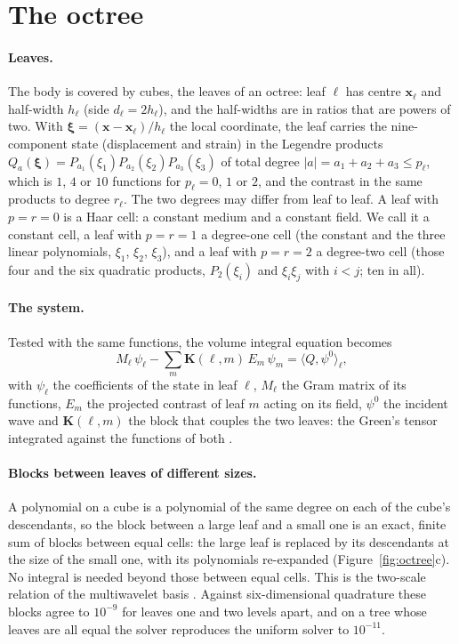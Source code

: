 \documentclass[11pt,a4paper]{article}
\newcommand{\bx}{\mathbf{x}}
\newcommand{\bK}{\mathbf{K}}
\begin{document}
\section{The octree}\label{sec:setting}

\paragraph{Leaves.} The body is covered by cubes, the leaves of an octree: leaf $\ell$ has centre
$\bx_\ell$ and half-width $h_\ell$ (side $d_\ell=2h_\ell$), and the half-widths are in ratios that are
powers of two. With $\boldsymbol\xi=(\bx-\bx_\ell)/h_\ell$ the local coordinate, the leaf carries the
nine-component state (displacement and strain) in the Legendre products
$Q_a(\boldsymbol\xi)=P_{a_1}(\xi_1)P_{a_2}(\xi_2)P_{a_3}(\xi_3)$ of total degree $|a|=a_1+a_2+a_3\le p_\ell$,
which is $1$, $4$ or $10$ functions for $p_\ell=0$, $1$ or $2$, and the contrast in the same products to
degree $r_\ell$. The two degrees may differ from leaf to leaf. A leaf with $p=r=0$ is a Haar cell: a
constant medium and a constant field. We call it a constant cell, a leaf with $p=r=1$ a degree-one cell
(the constant and the three linear polynomials, $\xi_1$, $\xi_2$, $\xi_3$), and a leaf with $p=r=2$ a
degree-two cell (those four and the six quadratic products, $P_2(\xi_i)$ and $\xi_i\xi_j$ with $i<j$; ten in all).

\paragraph{The system.} Tested with the same functions, the volume integral equation becomes
\begin{equation}\label{eq:system}
  M_\ell\,\psi_\ell-\sum_{m}\bK(\ell,m)\,E_m\,\psi_m=\langle Q,\psi^0\rangle_\ell ,
\end{equation}
with $\psi_\ell$ the coefficients of the state in leaf $\ell$, $M_\ell$ the Gram matrix of its
functions, $E_m$ the projected contrast of leaf $m$ acting on its field, $\psi^0$ the incident wave and
$\bK(\ell,m)$ the block that couples the two leaves: the Green's tensor integrated against the functions
of both \citep{NestorCoupling2026}.

\paragraph{Blocks between leaves of different sizes.} A polynomial on a cube is a polynomial of the
same degree on each of the cube's descendants, so the block between a large leaf and a small one is an
exact, finite sum of blocks between equal cells: the large leaf is replaced by its descendants at the
size of the small one, with its polynomials re-expanded (Figure~\ref{fig:octree}c). No integral is needed beyond those between equal cells. This is the two-scale
relation of the multiwavelet basis \citep{Alpert1993}. Against six-dimensional quadrature these blocks agree to $10^{-9}$ for leaves one and two
levels apart, and on a tree whose leaves are all equal the solver reproduces the uniform solver to
$10^{-11}$.
\end{document}
